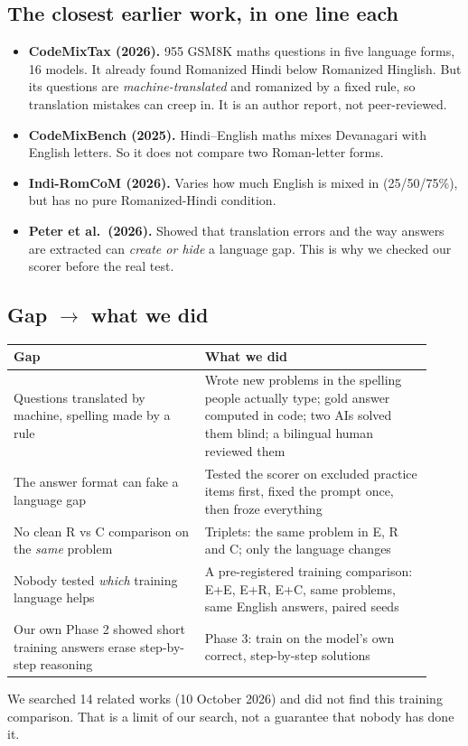 \documentclass[11pt,a4paper]{article}
\begin{document}
\subsection{The closest earlier work, in one line each}
\begin{itemize}
\item \textbf{CodeMixTax (2026).} 955 GSM8K maths questions in five language forms, 16 models. It already found Romanized Hindi below Romanized Hinglish. But its questions are \emph{machine-translated} and romanized by a fixed rule, so translation mistakes can creep in. It is an author report, not peer-reviewed.
\item \textbf{CodeMixBench (2025).} Hindi--English maths mixes Devanagari with English letters. So it does not compare two Roman-letter forms.
\item \textbf{Indi-RomCoM (2026).} Varies how much English is mixed in (25/50/75\%), but has no pure Romanized-Hindi condition.
\item \textbf{Peter et al.\ (2026).} Showed that translation errors and the way answers are extracted can \emph{create or hide} a language gap. This is why we checked our scorer before the real test.
\end{itemize}

\subsection{Gap $\rightarrow$ what we did}
\begin{center}
\renewcommand{\arraystretch}{1.25}\begin{tabular}{>{\raggedright\arraybackslash}p{0.42\linewidth}>{\raggedright\arraybackslash}p{0.50\linewidth}}
\toprule
\textbf{Gap} & \textbf{What we did}\\
\midrule
Questions translated by machine, spelling made by a rule & Wrote new problems in the spelling people actually type; gold answer computed in code; two AIs solved them blind; a bilingual human reviewed them\\
The answer format can fake a language gap & Tested the scorer on excluded practice items first, fixed the prompt once, then froze everything\\
No clean R vs C comparison on the \emph{same} problem & Triplets: the same problem in E, R and C; only the language changes\\
Nobody tested \emph{which} training language helps & A pre-registered training comparison: E+E, E+R, E+C, same problems, same English answers, paired seeds\\
Our own Phase 2 showed short training answers erase step-by-step reasoning & Phase 3: train on the model's own correct, step-by-step solutions\\
\bottomrule
\end{tabular}
\end{center}
We searched 14 related works (10 October 2026) and did not find this training comparison. That is a limit of our search, not a guarantee that nobody has done it.
\end{document}
